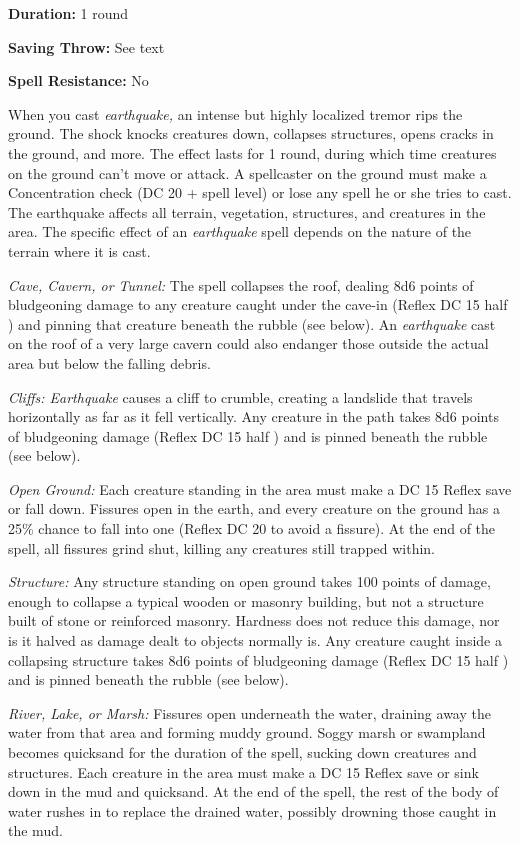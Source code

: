 \documentclass{article}
\begin{document}
\textbf{Duration:} 1 round

\textbf{Saving Throw:} See text

\textbf{Spell Resistance:} No

When you cast \textit{earthquake, }an intense but highly localized tremor rips 
the ground. The shock knocks creatures down, collapses structures, opens cracks 
in the ground, and more. The effect lasts for 1 round, during which time creatures 
on the ground can't move or attack. A spellcaster on the ground must make a Concentration 
check (DC 20 + spell level) or lose any spell he or she tries to cast. The earthquake 
affects all terrain, vegetation, structures, and creatures in the area. The specific 
effect of an \textit{earthquake }spell depends on the nature of the terrain where 
it is cast.

\textit{Cave, Cavern, or Tunnel: }The spell collapses the roof, dealing 8d6 points 
of bludgeoning damage to any creature caught under the cave-in (Reflex DC 15 half 
) and pinning that creature beneath the rubble (see below). An \textit{earthquake 
}cast on the roof of a very large cavern could also endanger those outside the 
actual area but below the falling debris.

\textit{Cliffs: Earthquake }causes a cliff to crumble, creating a landslide that 
travels horizontally as far as it fell vertically. Any creature in the path takes 
8d6 points of bludgeoning damage (Reflex DC 15 half ) and is pinned beneath the 
rubble (see below).

\textit{Open Ground: }Each creature standing in the area must make a DC 15 Reflex 
save or fall down. Fissures open in the earth, and every creature on the ground 
has a 25\% chance to fall into one (Reflex DC 20 to avoid a fissure). At the end 
of the spell, all fissures grind shut, killing any creatures still trapped within.

\textit{Structure: }Any structure standing on open ground takes 100 points of damage, 
enough to collapse a typical wooden or masonry building, but not a structure built 
of stone or reinforced masonry. Hardness does not reduce this damage, nor is it 
halved as damage dealt to objects normally is. Any creature caught inside a collapsing 
structure takes 8d6 points of bludgeoning damage (Reflex DC 15 half ) and is pinned 
beneath the rubble (see below).

\textit{River, Lake, or Marsh: }Fissures open underneath the water, draining away 
the water from that area and forming muddy ground. Soggy marsh or swampland becomes 
quicksand for the duration of the spell, sucking down creatures and structures. 
Each creature in the area must make a DC 15 Reflex save or sink down in the mud 
and quicksand. At the end of the spell, the rest of the body of water rushes in 
to replace the drained water, possibly drowning those caught in the mud.
\end{document}
